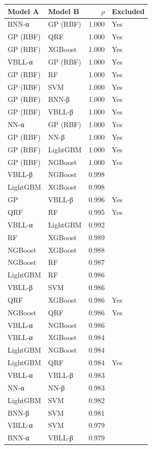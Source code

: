 \begin{tabular}{llrl}
\toprule
\textbf{Model A} & \textbf{Model B} & \textbf{$\rho$} & \textbf{Excluded} \\
\midrule
BNN-α & GP (RBF) & 1.000 & Yes \\
GP (RBF) & QRF & 1.000 & Yes \\
GP (RBF) & XGBoost & 1.000 & Yes \\
VBLL-α & GP (RBF) & 1.000 & Yes \\
GP (RBF) & RF & 1.000 & Yes \\
GP (RBF) & SVM & 1.000 & Yes \\
GP (RBF) & BNN-β & 1.000 & Yes \\
GP (RBF) & VBLL-β & 1.000 & Yes \\
NN-α & GP (RBF) & 1.000 & Yes \\
GP (RBF) & NN-β & 1.000 & Yes \\
GP (RBF) & LightGBM & 1.000 & Yes \\
GP (RBF) & NGBoost & 1.000 & Yes \\
VBLL-β & NGBoost & 0.998 &  \\
LightGBM & XGBoost & 0.998 &  \\
GP & VBLL-β & 0.996 & Yes \\
QRF & RF & 0.995 & Yes \\
VBLL-α & LightGBM & 0.992 &  \\
RF & XGBoost & 0.989 &  \\
NGBoost & XGBoost & 0.988 &  \\
NGBoost & RF & 0.987 &  \\
LightGBM & RF & 0.986 &  \\
VBLL-β & SVM & 0.986 &  \\
QRF & XGBoost & 0.986 & Yes \\
NGBoost & QRF & 0.986 & Yes \\
VBLL-α & NGBoost & 0.986 &  \\
VBLL-α & XGBoost & 0.984 &  \\
LightGBM & NGBoost & 0.984 &  \\
LightGBM & QRF & 0.984 & Yes \\
VBLL-α & VBLL-β & 0.983 &  \\
NN-α & NN-β & 0.983 &  \\
LightGBM & SVM & 0.982 &  \\
BNN-β & SVM & 0.981 &  \\
VBLL-α & SVM & 0.979 &  \\
BNN-α & VBLL-β & 0.979 &  \\

\end{tabular}
